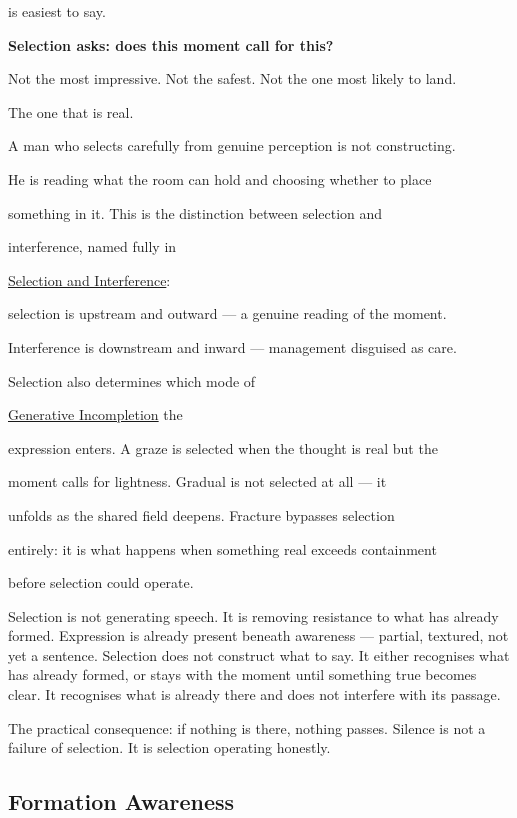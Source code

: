 \documentclass[12pt, a4paper]{article}
\begin{document}
is easiest to say.

\begin{center}

\textbf{Selection asks: does this moment call for this?}

\end{center}

Not the most impressive. Not the safest. Not the one most likely to land.

The one that is real.

A man who selects carefully from genuine perception is not constructing.

He is reading what the room can hold and choosing whether to place

something in it. This is the distinction between selection and

interference, named fully in

\hyperref[subsec:selection_and_interference]{Selection and Interference}:

selection is upstream and outward --- a genuine reading of the moment.

Interference is downstream and inward --- management disguised as care.

Selection also determines which mode of

\hyperref[sec:generative_incompletion]{Generative Incompletion} the

expression enters. A graze is selected when the thought is real but the

moment calls for lightness. Gradual is not selected at all --- it

unfolds as the shared field deepens. Fracture bypasses selection

entirely: it is what happens when something real exceeds containment

before selection could operate.

Selection is not generating speech. It is removing resistance to what
has already formed. Expression is already present beneath awareness ---
partial, textured, not yet a sentence. Selection does not construct what to say. It either recognises what has already formed, or stays with the moment until something true becomes clear. It recognises what is already there and does not interfere
with its passage.

The practical consequence: if nothing is there, nothing passes. Silence
is not a failure of selection. It is selection operating honestly.


\subsection{Formation Awareness}
\end{document}
